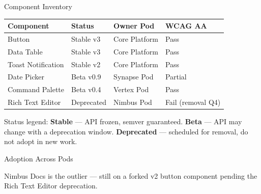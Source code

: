 \documentclass[aspectratio=169,10pt]{beamer}
\begin{document}
\begin{frame}{Component Inventory}
  \small
  \begin{table}
    \centering
    \renewcommand{\arraystretch}{1.25}
    \begin{tabular}{@{}llll@{}}
      \toprule
      \textbf{Component} & \textbf{Status} & \textbf{Owner Pod} & \textbf{WCAG AA} \\
      \midrule
      Button & Stable v3 & Core Platform & \color{nexateal}Pass \\
      Data Table & Stable v3 & Core Platform & \color{nexateal}Pass \\
      Toast Notification & Stable v2 & Core Platform & \color{nexateal}Pass \\
      Date Picker & Beta v0.9 & Synapse Pod & \color{nexaamber}Partial \\
      Command Palette & Beta v0.4 & Vertex Pod & \color{nexateal}Pass \\
      Rich Text Editor & Deprecated & Nimbus Pod & Fail (removal Q4) \\
      \bottomrule
    \end{tabular}
  \end{table}
  \vfill
  {\scriptsize\color{nexagray}Status legend: \textbf{Stable} --- API frozen, semver guaranteed.
  \textbf{Beta} --- API may change with a deprecation window.
  \textbf{Deprecated} --- scheduled for removal, do not adopt in new work.}
\end{frame}

\begin{frame}{Adoption Across Pods}
  \centering
  \vspace{0.2cm}
  {\scriptsize\color{nexagray}Nimbus Docs is the outlier --- still on a forked v2 button
  component pending the Rich Text Editor deprecation.}
\end{frame}
\end{document}
